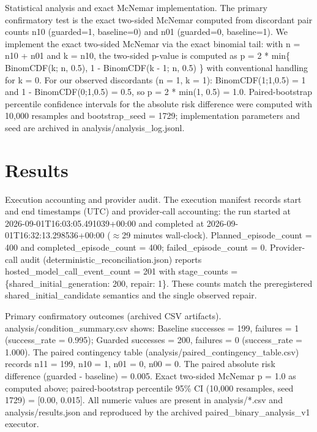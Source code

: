 \documentclass[conference]{IEEEtran}
\begin{document}
Statistical analysis and exact McNemar implementation. The primary confirmatory test is the exact two-sided McNemar computed from discordant pair counts n10 (guarded=1, baseline=0) and n01 (guarded=0, baseline=1). We implement the exact two-sided McNemar via the exact binomial tail: with n = n10 + n01 and k = n10, the two-sided p-value is computed as
p = 2 * min\{ BinomCDF(k; n, 0.5), 1 - BinomCDF(k - 1; n, 0.5) \}
with conventional handling for k = 0. For our observed discordants (n = 1, k = 1): BinomCDF(1;1,0.5) = 1 and 1 - BinomCDF(0;1,0.5) = 0.5, so p = 2 * min(1, 0.5) = 1.0. Paired-bootstrap percentile confidence intervals for the absolute risk difference were computed with 10,000 resamples and bootstrap\_seed = 1729; implementation parameters and seed are archived in analysis/analysis\_log.jsonl.

\section{Results}
Execution accounting and provider audit. The execution manifest records start and end timestamps (UTC) and provider-call accounting: the run started at 2026-09-01T16:03:05.491039+00:00 and completed at 2026-09-01T16:32:13.298536+00:00 (\ensuremath{\approx}29 minutes wall-clock). Planned\_episode\_count = 400 and completed\_episode\_count = 400; failed\_episode\_count = 0. Provider-call audit (deterministic\_reconciliation.json) reports hosted\_model\_call\_event\_count = 201 with stage\_counts = \{shared\_initial\_generation: 200, repair: 1\}. These counts match the preregistered shared\_initial\_candidate semantics and the single observed repair.

Primary confirmatory outcomes (archived CSV artifacts). analysis/condition\_summary.csv shows: Baseline successes = 199, failures = 1 (success\_rate = 0.995); Guarded successes = 200, failures = 0 (success\_rate = 1.000). The paired contingency table (analysis/paired\_contingency\_table.csv) records n11 = 199, n10 = 1, n01 = 0, n00 = 0. The paired absolute risk difference (guarded - baseline) = 0.005. Exact two-sided McNemar p = 1.0 as computed above; paired-bootstrap percentile 95\% CI (10,000 resamples, seed 1729) = [0.00, 0.015]. All numeric values are present in analysis/*.csv and analysis/results.json and reproduced by the archived paired\_binary\_analysis\_v1 executor.
\end{document}
